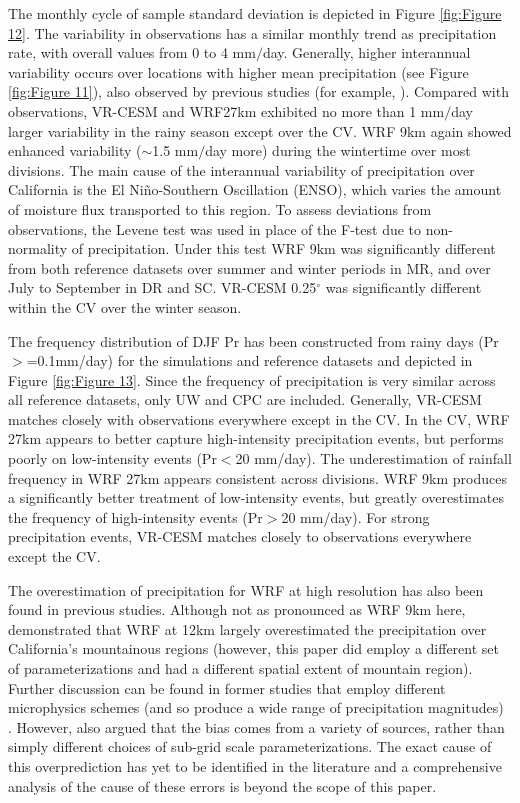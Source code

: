 \documentclass[draft,ms]{agutex}   %
\begin{document}
\begin{article}
The monthly cycle of sample standard deviation is depicted in Figure \ref{fig:Figure 12}. The variability in observations has a similar monthly trend as precipitation rate, with overall values from 0 to 4 mm$/$day.  Generally, higher interannual variability occurs over locations with higher mean precipitation (see Figure \ref{fig:Figure 11}), also observed by previous studies (for example, \cite{duffy2006simulations}). Compared with observations, VR-CESM and WRF27km exhibited no more than 1 mm$/$day larger variability in the rainy season except over the CV. WRF 9km again showed enhanced variability ($\sim$1.5 mm$/$day more) during the wintertime over most divisions. The main cause of the interannual variability of precipitation over California is the El Ni\~{n}o-Southern Oscillation (ENSO), which varies the amount of moisture flux transported to this region. To assess deviations from observations, the Levene test was used in place of the F-test due to non-normality of precipitation. Under this test WRF 9km was significantly different from both reference datasets over summer and winter periods in MR, and over July to September in DR and SC.  VR-CESM 0.25$^\circ$ was significantly different within the CV over the  winter season.


The frequency distribution of DJF Pr has been constructed from rainy days (Pr$>$=0.1mm/day) for the simulations and reference datasets and depicted in Figure \ref{fig:Figure 13}.  Since the frequency of precipitation is very similar across all reference datasets, only UW and CPC are included. Generally, VR-CESM matches closely with observations everywhere except in the CV. In the CV, WRF 27km appears to better capture high-intensity precipitation events, but performs poorly on low-intensity events (Pr$<$20 mm/day). The underestimation of rainfall frequency in WRF 27km appears consistent across divisions. WRF 9km produces a significantly better treatment of low-intensity events, but greatly overestimates the frequency of high-intensity events (Pr$>$20 mm/day). For strong precipitation events, VR-CESM matches closely to observations everywhere except the CV.


The overestimation of precipitation for WRF at high resolution has also been found in previous studies. Although not as pronounced as WRF 9km here, \citet{caldwell2009evaluation} demonstrated that WRF at 12km largely overestimated the precipitation over California's mountainous regions (however, this paper did employ a different set of parameterizations and had a different spatial extent of mountain region). Further discussion can be found in former studies that employ different microphysics schemes (and so produce a wide range of precipitation magnitudes) \citep{jankov2005impact, chin2010preliminary, caldwell2010california}. However, \citet{caldwell2009evaluation} also argued that the bias comes from a variety of sources, rather than simply different choices of sub-grid scale parameterizations. The exact cause of this overprediction has yet to be identified in the literature and a comprehensive analysis of the cause of these errors is beyond the scope of this paper. 



\end{article}
\end{document}
